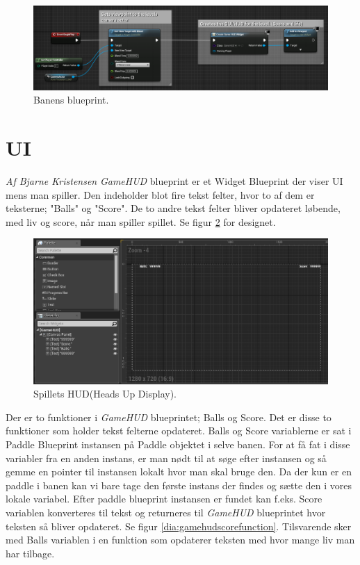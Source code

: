 \begin{figure}
	\begin{center}
		\caption{Banens blueprint.}
		\label{dia:levelblueprint}
		\includegraphics[width=0.98\linewidth]{pictures/blueprints/level_blueprint}
	\end{center}
\end{figure}

\section{UI}
\textit{Af Bjarne Kristensen}\newline
\textit{GameHUD} blueprint er et Widget Blueprint der viser UI mens man spiller. Den indeholder blot fire tekst felter, hvor to af dem er teksterne; "Balls" og "Score". De to andre tekst felter bliver opdateret løbende, med liv og score, når man spiller spillet. Se figur \ref{dia:gamehuddesign} for designet.

\begin{figure}
	\begin{center}
		\caption{Spillets HUD(Heads Up Display).}
		\label{dia:gamehuddesign}
		\includegraphics[width=0.98\linewidth]{pictures/blueprints/gamehud-design}
	\end{center}
\end{figure}

Der er to funktioner i \textit{GameHUD} blueprintet; Balls og Score. Det er disse to funktioner som holder tekst felterne opdateret. Balls og Score variablerne er sat i Paddle Blueprint instansen på Paddle objektet i selve banen. For at få fat i disse variabler fra en anden instans, er man nødt til at søge efter instansen og så gemme en pointer til instansen lokalt hvor man skal bruge den. Da der kun er en paddle i banen kan vi bare tage den første instans der findes og sætte den i vores lokale variabel. Efter paddle blueprint instansen er fundet kan f.eks. Score variablen konverteres til tekst og returneres til \textit{GameHUD} blueprintet hvor teksten så bliver opdateret. Se figur \ref{dia:gamehudscorefunction}. Tilsvarende sker med Balls variablen i en funktion som opdaterer teksten med hvor mange liv man har tilbage.

